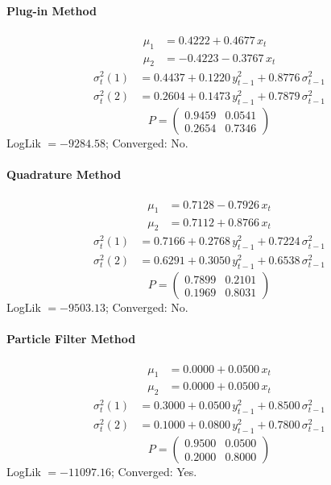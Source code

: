 \documentclass[11pt, a4paper]{article}
\begin{document}
\paragraph{Plug-in Method}
\begin{align}
\mu_{1} &= 0.4222 + 0.4677\, x_t \\
\mu_{2} &= -0.4223 -0.3767\, x_t
\end{align}
\begin{align}
\sigma^2_{t}(1) &= 0.4437 + 0.1220\, y_{t-1}^2 + 0.8776\, \sigma^2_{t-1} \\
\sigma^2_{t}(2) &= 0.2604 + 0.1473\, y_{t-1}^2 + 0.7879\, \sigma^2_{t-1}
\end{align}
\begin{equation}
P = \begin{pmatrix} 0.9459 & 0.0541 \\ 0.2654 & 0.7346 \end{pmatrix}
\end{equation}
LogLik $= -9284.58$; Converged: No.

\paragraph{Quadrature Method}
\begin{align}
\mu_{1} &= 0.7128 -0.7926\, x_t \\
\mu_{2} &= 0.7112 + 0.8766\, x_t
\end{align}
\begin{align}
\sigma^2_{t}(1) &= 0.7166 + 0.2768\, y_{t-1}^2 + 0.7224\, \sigma^2_{t-1} \\
\sigma^2_{t}(2) &= 0.6291 + 0.3050\, y_{t-1}^2 + 0.6538\, \sigma^2_{t-1}
\end{align}
\begin{equation}
P = \begin{pmatrix} 0.7899 & 0.2101 \\ 0.1969 & 0.8031 \end{pmatrix}
\end{equation}
LogLik $= -9503.13$; Converged: No.

\paragraph{Particle Filter Method}
\begin{align}
\mu_{1} &= 0.0000 + 0.0500\, x_t \\
\mu_{2} &= 0.0000 + 0.0500\, x_t
\end{align}
\begin{align}
\sigma^2_{t}(1) &= 0.3000 + 0.0500\, y_{t-1}^2 + 0.8500\, \sigma^2_{t-1} \\
\sigma^2_{t}(2) &= 0.1000 + 0.0800\, y_{t-1}^2 + 0.7800\, \sigma^2_{t-1}
\end{align}
\begin{equation}
P = \begin{pmatrix} 0.9500 & 0.0500 \\ 0.2000 & 0.8000 \end{pmatrix}
\end{equation}
LogLik $= -11097.16$; Converged: Yes.
\end{document}
